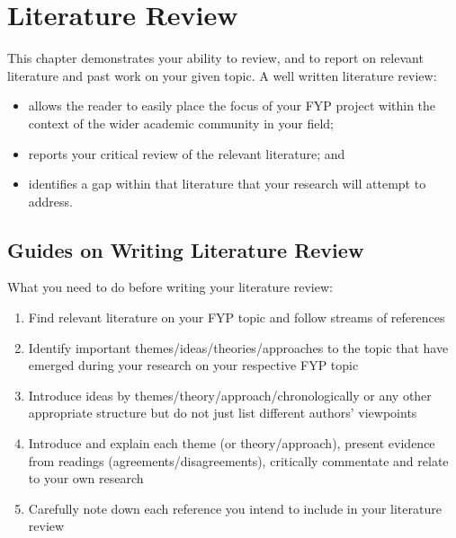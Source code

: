 \chapter{Literature Review}
This chapter demonstrates your ability to review, and to report on relevant literature and past work on your given topic. A well written literature review:

\begin{itemize}
	\item allows the reader to easily place the focus of your FYP project within the context of the wider academic community in your field;
	\item reports your critical review of the relevant literature; and
	\item identifies a gap within that literature that your research will attempt to address.
\end{itemize}

\section{Guides on Writing Literature Review}
What you need to do before writing your literature review:

\begin{enumerate}
	\item Find relevant literature on your FYP topic and follow streams of references
	\item Identify important themes/ideas/theories/approaches to the topic that have emerged during your research on your respective FYP topic
	\item Introduce ideas by themes/theory/approach/chronologically or any other appropriate structure but do not just list different authors’ viewpoints
	\item Introduce and explain each theme (or theory/approach), present evidence from readings (agreements/disagreements), critically commentate and relate to your own research
	\item Carefully note down each reference you intend to include in your literature review
\end{enumerate}
